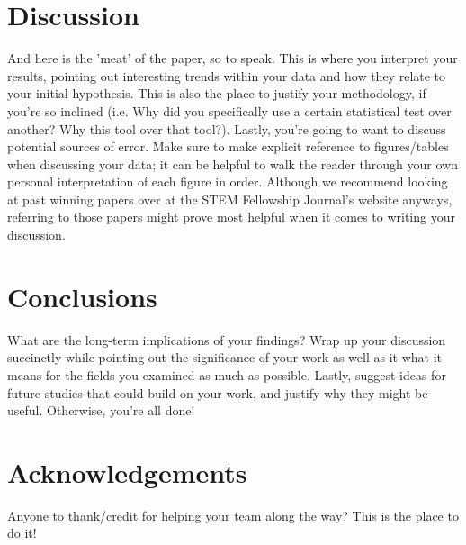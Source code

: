 \documentclass[10pt,twocolumn,letterpaper]{article}
\begin{document}
\section{Discussion}
And here is the 'meat' of the paper, so to speak. This is where you interpret your results, pointing out interesting trends within your data and how they relate to your initial hypothesis. This is also the place to justify your methodology, if you're so inclined (i.e. Why did you specifically use a certain statistical test over another? Why this tool over that tool?). Lastly, you're going to want to discuss potential sources of error. Make sure to make explicit reference to figures/tables when discussing your data; it can be helpful to walk the reader through your own personal interpretation of each figure in order. Although we recommend looking at past winning papers over at the STEM Fellowship Journal's website anyways, referring to those papers might prove most helpful when it comes to writing your discussion.

\section*{Conclusions}
What are the long-term implications of your findings? Wrap up your discussion succinctly while pointing out the significance of your work as well as it what it means for the fields you examined as much as possible. Lastly, suggest ideas for future studies that could build on your work, and justify why they might be useful. Otherwise, you're all done!

\section*{Acknowledgements}
Anyone to thank/credit for helping your team along the way? This is the place to do it!


\end{document}
